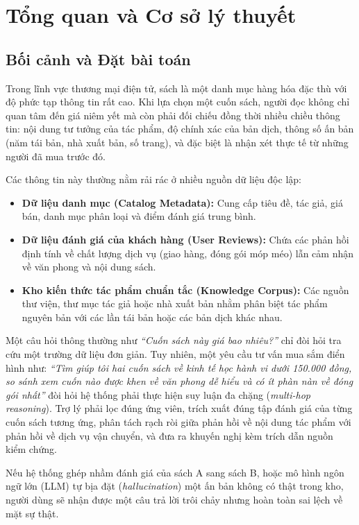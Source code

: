 \section{Tổng quan và Cơ sở lý thuyết}

\subsection{Bối cảnh và Đặt bài toán}
Trong lĩnh vực thương mại điện tử, sách là một danh mục hàng hóa đặc thù với độ phức tạp thông tin rất cao. Khi lựa chọn một cuốn sách, người đọc không chỉ quan tâm đến giá niêm yết mà còn phải đối chiếu đồng thời nhiều chiều thông tin: nội dung tư tưởng của tác phẩm, độ chính xác của bản dịch, thông số ấn bản (năm tái bản, nhà xuất bản, số trang), và đặc biệt là nhận xét thực tế từ những người đã mua trước đó.

Các thông tin này thường nằm rải rác ở nhiều nguồn dữ liệu độc lập:
\begin{itemize}
    \item \textbf{Dữ liệu danh mục (Catalog Metadata):} Cung cấp tiêu đề, tác giả, giá bán, danh mục phân loại và điểm đánh giá trung bình.
    \item \textbf{Dữ liệu đánh giá của khách hàng (User Reviews):} Chứa các phản hồi định tính về chất lượng dịch vụ (giao hàng, đóng gói móp méo) lẫn cảm nhận về văn phong và nội dung sách.
    \item \textbf{Kho kiến thức tác phẩm chuẩn tắc (Knowledge Corpus):} Các nguồn thư viện, thư mục tác giả hoặc nhà xuất bản nhằm phân biệt tác phẩm nguyên bản với các lần tái bản hoặc các bản dịch khác nhau.
\end{itemize}

Một câu hỏi thông thường như \textit{``Cuốn sách này giá bao nhiêu?''} chỉ đòi hỏi tra cứu một trường dữ liệu đơn giản. Tuy nhiên, một yêu cầu tư vấn mua sắm điển hình như: \textit{``Tìm giúp tôi hai cuốn sách về kinh tế học hành vi dưới 150.000 đồng, so sánh xem cuốn nào được khen về văn phong dễ hiểu và có ít phàn nàn về đóng gói nhất''} đòi hỏi hệ thống phải thực hiện suy luận đa chặng (\textit{multi-hop reasoning}). Trợ lý phải lọc đúng ứng viên, trích xuất đúng tập đánh giá của từng cuốn sách tương ứng, phân tách rạch ròi giữa phản hồi về nội dung tác phẩm với phản hồi về dịch vụ vận chuyển, và đưa ra khuyến nghị kèm trích dẫn nguồn kiểm chứng.

Nếu hệ thống ghép nhầm đánh giá của sách A sang sách B, hoặc mô hình ngôn ngữ lớn (LLM) tự bịa đặt (\textit{hallucination}) một ấn bản không có thật trong kho, người dùng sẽ nhận được một câu trả lời trôi chảy nhưng hoàn toàn sai lệch về mặt sự thật.

